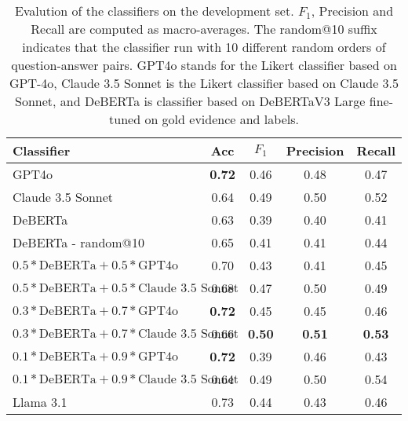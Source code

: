 \begin{table*}
    \centering
    \begin{tabular}{lcccc}
        \toprule
        \textbf{Classifier} & \textbf{Acc} & \textbf{$F_1$} & \textbf{Precision} & \textbf{Recall} \\
        \midrule
        GPT4o & \textbf{0.72} & 0.46 & 0.48 & 0.47 \\
        Claude 3.5 Sonnet & 0.64 & 0.49 & 0.50 & 0.52 \\
        DeBERTa & 0.63 & 0.39 & 0.40 & 0.41 \\
        DeBERTa - random@10 & 0.65 & 0.41 & 0.41 & 0.44 \\
        $0.5*\mbox{DeBERTa}+0.5*\mbox{GPT4o}$ & 0.70 & 0.43 & 0.41 & 0.45 \\
        $0.5*\mbox{DeBERTa}+0.5*\mbox{Claude 3.5 Sonnet}$ & 0.68 & 0.47 & 0.50 & 0.49 \\
        $0.3*\mbox{DeBERTa}+0.7*\mbox{GPT4o}$ & \textbf{0.72} & 0.45 & 0.45 & 0.46 \\
        $0.3*\mbox{DeBERTa}+0.7*\mbox{Claude 3.5 Sonnet}$ & 0.66 & \textbf{0.50} & \textbf{0.51} & \textbf{0.53} \\
        $0.1*\mbox{DeBERTa}+0.9*\mbox{GPT4o}$ & \textbf{0.72} & 0.39 & 0.46 & 0.43 \\
        $0.1*\mbox{DeBERTa}+0.9*\mbox{Claude 3.5 Sonnet}$ & 0.64 & 0.49 & 0.50 & 0.54 \\
        \midrule
        Llama 3.1 & 0.73 & 0.44 & 0.43 & 0.46 \\
        \bottomrule
    \end{tabular} 
    \caption{Evalution of the classifiers on the development set. $F_1$, Precision and Recall are computed as macro-averages. The random@10 suffix indicates that the classifier run with 10 different random orders of question-answer pairs. GPT4o stands for the Likert classifier based on GPT-4o, Claude 3.5 Sonnet is the Likert classifier based on Claude 3.5 Sonnet, and DeBERTa is classifier based on DeBERTaV3 Large fine-tuned on \averitec{} gold evidence and labels.}
    \label{tab:nli}
\end{table*}